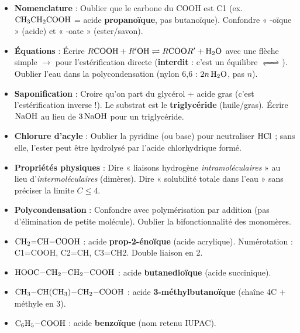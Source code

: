 \documentclass[11pt]{article}
\begin{document}
\begin{attention}
\begin{itemize}
  \item \textbf{Nomenclature} : Oublier que le carbone du $\mathrm{COOH}$ est C1 (ex. $\ce{CH3CH2COOH}$ = acide \textbf{propanoïque}, pas butanoïque). Confondre « -oïque » (acide) et « -oate » (ester/savon).
  \item \textbf{Équations} : Écrire $R\mathrm{COOH} + R'\mathrm{OH} \rightleftharpoons R\mathrm{COO}R' + \ce{H2O}$ avec une flèche simple $\rightarrow$ pour l'estérification directe (\textbf{interdit} : c'est un équilibre $\ce{<=>}$). Oublier l'eau dans la polycondensation (nylon 6,6 : $2n\,\ce{H2O}$, pas $n$).
  \item \textbf{Saponification} : Croire qu'on part du glycérol + acide gras (c'est l'estérification inverse !). Le substrat est le \textbf{triglycéride} (huile/gras). Écrire $\ce{NaOH}$ au lieu de $3\,\ce{NaOH}$ pour un triglycéride.
  \item \textbf{Chlorure d'acyle} : Oublier la pyridine (ou base) pour neutraliser $\ce{HCl}$ ; sans elle, l'ester peut être hydrolysé par l'acide chlorhydrique formé.
  \item \textbf{Propriétés physiques} : Dire « liaisons hydrogène \emph{intramoléculaires} » au lieu d'\emph{intermoléculaires} (dimères). Dire « solubilité totale dans l'eau » sans préciser la limite $C \le 4$.
  \item \textbf{Polycondensation} : Confondre avec polymérisation par addition (pas d'élimination de petite molécule). Oublier la bifonctionnalité des monomères.
\end{itemize}
\end{attention}

\begin{exemplebox}
\begin{itemize}
  \item $\ce{CH2=CH-COOH}$ : acide \textbf{prop-2-énoïque} (acide acrylique). Numérotation : C1=COOH, C2=CH, C3=CH2. Double liaison en 2.
  \item $\ce{HOOC-CH2-CH2-COOH}$ : acide \textbf{butanedioïque} (acide succinique).
  \item $\ce{CH3-CH(CH3)-CH2-COOH}$ : acide \textbf{3-méthylbutanoïque} (chaîne 4C + méthyle en 3).
  \item $\ce{C6H5-COOH}$ : acide \textbf{benzoïque} (nom retenu IUPAC).
\end{itemize}
\end{exemplebox}
\end{document}

